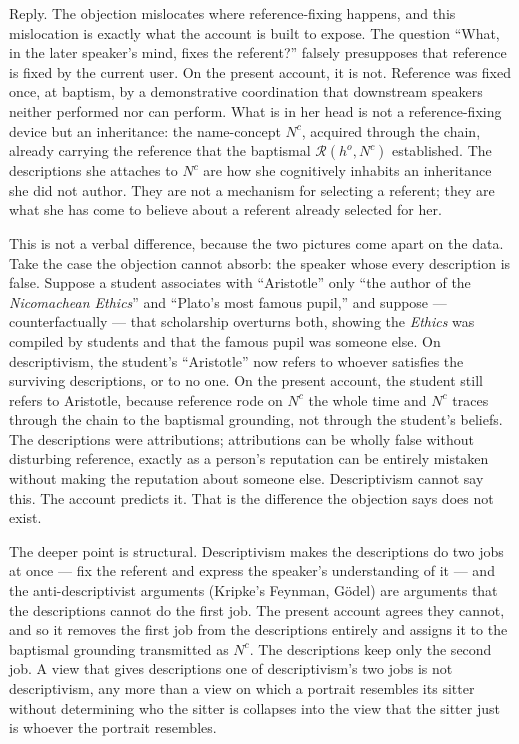\documentclass[12pt,a4paper]{article}
\begin{document}
Reply. The objection mislocates where reference-fixing happens, and this mislocation is exactly what the account is built to expose. The question ``What, in the later speaker's mind, fixes the referent?'' falsely presupposes that reference is fixed by the current user. On the present account, it is not. Reference was fixed once, at baptism, by a demonstrative coordination that downstream speakers neither performed nor can perform. What is in her head is not a reference-fixing device but an inheritance: the name-concept \(N^c\), acquired through the chain, already carrying the reference that the baptismal \(\mathcal{R}(h^o, N^c)\) established. The descriptions she attaches to \(N^c\) are how she cognitively inhabits an inheritance she did not author. They are not a mechanism for selecting a referent; they are what she has come to believe about a referent already selected for her.

This is not a verbal difference, because the two pictures come apart on the data. Take the case the objection cannot absorb: the speaker whose every description is false. Suppose a student associates with ``Aristotle'' only ``the author of the \emph{Nicomachean Ethics}'' and ``Plato's most famous pupil,'' and suppose --- counterfactually --- that scholarship overturns both, showing the \emph{Ethics} was compiled by students and that the famous pupil was someone else. On descriptivism, the student's ``Aristotle'' now refers to whoever satisfies the surviving descriptions, or to no one. On the present account, the student still refers to Aristotle, because reference rode on \(N^c\) the whole time and \(N^c\) traces through the chain to the baptismal grounding, not through the student's beliefs. The descriptions were attributions; attributions can be wholly false without disturbing reference, exactly as a person's reputation can be entirely mistaken without making the reputation about someone else. Descriptivism cannot say this. The account predicts it. That is the difference the objection says does not exist.

The deeper point is structural. Descriptivism makes the descriptions do two jobs at once --- fix the referent and express the speaker's understanding of it --- and the anti-descriptivist arguments (Kripke's Feynman, Gödel) are arguments that the descriptions cannot do the first job. The present account agrees they cannot, and so it removes the first job from the descriptions entirely and assigns it to the baptismal grounding transmitted as \(N^c\). The descriptions keep only the second job. A view that gives descriptions one of descriptivism's two jobs is not descriptivism, any more than a view on which a portrait resembles its sitter without determining who the sitter is collapses into the view that the sitter just is whoever the portrait resembles.
\end{document}
